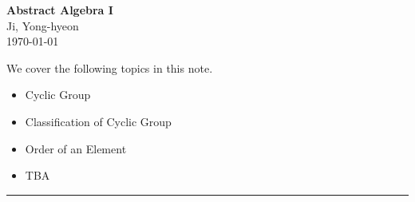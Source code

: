 \documentclass[11pt,openany]{article}
\begin{document}
\begin{center}
	\huge\textbf{Abstract Algebra I}\\
	\vspace{0.5em}
	\large{Ji, Yong-hyeon}\\
	\vspace{0.5em}
	\normalsize{\today}\\
\end{center}

\noindent 
We cover the following topics in this note.
\begin{itemize}
	\item Cyclic Group
	\item Classification of Cyclic Group
	\item Order of an Element
	\item TBA
\end{itemize}
\hrule\vspace{12pt}
\newpage

\end{document}
